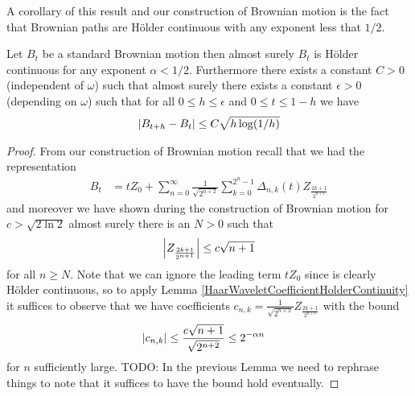 A corollary of this result and our construction of Brownian motion is
the fact that Brownian paths are H\"older continuous with any exponent
less that $1/2$.
\begin{thm}\label{BrownianHolderContinuous}Let $B_t$ be a standard
  Brownian motion then almost surely $B_t$ is H\"older continuous for
  any exponent $\alpha < 1/2$.  Furthermore there exists a constant $C
  > 0$ (independent of $\omega$) such that almost surely there exists
  a constant $\epsilon > 0$ (depending on $\omega$) such that for all
  $0 \leq h \leq \epsilon$ and $0 \leq t \leq 1-h$ we have 
\begin{align*}
\left \vert B_{t+h} - B_t \right \vert \leq C \sqrt{h \log(1/h)}
\end{align*}
\end{thm}
\begin{proof}
From our construction of Brownian motion recall that we had the
representation
\begin{align*}
B_t &= t Z_0 + \sum_{n=0}^\infty \frac{1}{\sqrt{2^{n+2}}}
\sum_{k=0}^{2^n -1} \Delta_{n,k}(t) Z_{\frac{2k+1}{2^{n+1}}}
\end{align*}
and moreover we have shown during the construction of Brownian motion
for $c > \sqrt{2 \ln 2}$ almost surely there is an $N>0$ such that 
\begin{align*}
\left \vert Z_{\frac{2k+1}{2^{n+1}}} \right \vert \leq c \sqrt{n+1}
\end{align*}
for all $n \geq N$.  Note that we can ignore the leading term $t Z_0$ since is clearly
H\"older continuous, so to apply Lemma
\ref{HaarWaveletCoefficientHolderContinuity}
it suffices to observe that we have coefficients $c_{n,k} =
\frac{1}{\sqrt{2^{n+2}}}Z_{\frac{2k+1}{2^{n+1}}}$ with the bound
\begin{align*}
\left \vert c_{n,k} \right \vert &\leq \frac{c\sqrt{n+1}}{\sqrt{2^{n+2}}} \leq 2^{-\alpha n}
\end{align*}
for $n$ sufficiently large.  TODO: In the previous Lemma we need to
rephrase things to note that it suffices to have the bound hold
eventually.


\end{proof}
